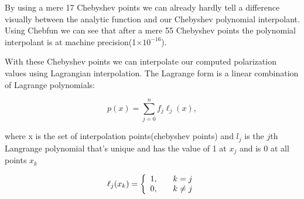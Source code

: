 \documentclass{report}
\theoremstyle{definition}
\providecommand{\e}[1]{\ensuremath{\times 10^{#1}}}
\begin{document}
%

By using a mere 17 Chebyshev points we can already hardly tell a difference visually between the analytic function and our Chebyshev polynomial interpolant. Using Chebfun we can see that after a mere 55 Chebyshev points the polynomial interpolant is at machine precision(1\e{-16}).

 With these Chebyshev points we can interpolate our computed polarization values using Lagrangian interpolation. The Lagrange form is a linear combination of Lagrange polynomials: 

\begin{equation}
p(x) = \sum_{j=0}^{n} f_{j}\ell_{j}(x),
\end{equation}

\noindent where x is the set of interpolation points(chebyshev points) and $l_{j}$ is the $j$th Langrange polynomial that's unique and has the value of 1 at $x_{j}$ and is 0 at all points $x_{k}$

\begin{equation}
\ell_{j}(x_{k}) = \left\{ 
  \begin{array}{l l}
    1, & \quad k = j \\
    0, & \quad k \neq j \\
  \end{array} \right.
\end{equation}

%


%
%
\end{document}
